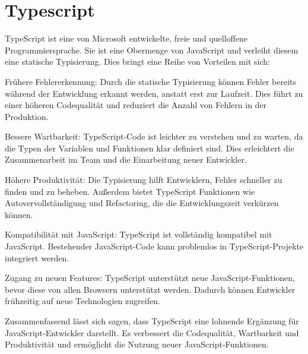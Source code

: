 \section{Typescript}

TypeScript ist eine von Microsoft entwickelte, freie und quelloffene Programmiersprache. Sie ist eine Obermenge von JavaScript und verleiht diesem eine statische Typisierung. Dies bringt eine Reihe von Vorteilen mit sich:

Frühere Fehlererkennung: Durch die statische Typisierung können Fehler bereits während der Entwicklung erkannt werden, anstatt erst zur Laufzeit. Dies führt zu einer höheren Codequalität und reduziert die Anzahl von Fehlern in der Produktion.

Bessere Wartbarkeit: TypeScript-Code ist leichter zu verstehen und zu warten, da die Typen der Variablen und Funktionen klar definiert sind. Dies erleichtert die Zusammenarbeit im Team und die Einarbeitung neuer Entwickler.

Höhere Produktivität: Die Typisierung hilft Entwicklern, Fehler schneller zu finden und zu beheben. Außerdem bietet TypeScript Funktionen wie Autovervollständigung und Refactoring, die die Entwicklungszeit verkürzen können.

Kompatibilität mit JavaScript: TypeScript ist vollständig kompatibel mit JavaScript. Bestehender JavaScript-Code kann problemlos in TypeScript-Projekte integriert werden.

Zugang zu neuen Features: TypeScript unterstützt neue JavaScript-Funktionen, bevor diese von allen Browsern unterstützt werden. Dadurch können Entwickler frühzeitig auf neue Technologien zugreifen.

Zusammenfassend lässt sich sagen, dass TypeScript eine lohnende Ergänzung für JavaScript-Entwickler darstellt. Es verbessert die Codequalität, Wartbarkeit und Produktivität und ermöglicht die Nutzung neuer JavaScript-Funktionen.